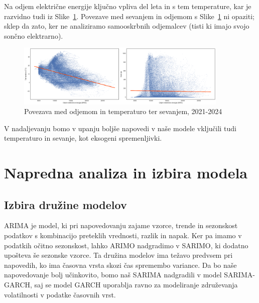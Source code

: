 \documentclass[a4paper, 11pt]{article}
\begin{document}
\noindent Na odjem električne energije ključno vpliva del leta in s tem temperature, kar je razvidno tudi iz Slike~\ref{fig:temp_sevanje}.  
Povezave med sevanjem in odjemom s Slike~\ref{fig:temp_sevanje} ni opaziti; sklep da zato, ker 
ne analiziramo samooskrbnih odjemalcev (tisti ki imajo svojo sončno elektrarno). 

\begin{figure}[h!]
    \centering
    \caption{Povezava med odjemom in temperaturo ter sevanjem, 2021-2024}\par\medskip
    \label{fig:temp_sevanje}
    \includegraphics[width=0.9\textwidth]{temp_sevanje.png}
\end{figure}

\noindent V nadaljevanju bomo v upanju boljše napovedi v naše modele vključili tudi temperaturo in sevanje, 
kot eksogeni spremenljivki.




\section{Napredna analiza in izbira modela}

\subsection{Izbira družine modelov}

ARIMA je model, ki pri napovedovanju zajame vzorce, trende in sezonskost podatkov s kombinacijo preteklih 
vrednosti, razlik in napak. Ker pa imamo v podatkih očitno sezonskost, lahko ARIMO nadgradimo v SARIMO, ki dodatno
upošteva še sezonske vzorce. Ta družina modelov ima težavo predvsem pri napovedih, ko ima časovna vrsta 
skozi čas spremembo variance. Da bo naše napovedovanje bolj učinkovito, bomo naš SARIMA nadgradili v 
model SARIMA-GARCH, saj se model GARCH uporablja ravno za modeliranje združevanja volatilnosti 
v podatke časovnih vrst.~\cite{ArimaGarch}
\end{document}
